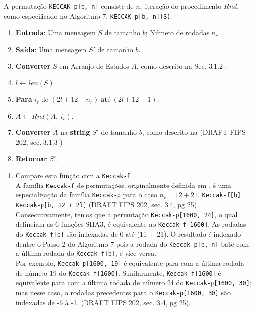 \documentclass[12pt, a4paper]{article}
\begin{document}
\begin{enumerate}
\begin{enumerate}
A permutação \verb|KECCAK-p[b, n]| consiste de $n_r$ iteração do procedimento
$Rnd$, como especificado no Algoritmo 7, \verb|KECCAK-p[b, n](S)|.\\

  \begin{enumerate}
    \item \textbf{Entrada}: Uma mensagem $S$ de tamanho $b$; Número de rodadas
    $n_r$.
    \item \textbf{Saída}: Uma mensagem $S'$ de tamanho $b$.
    \item \textbf{Converter} $S$ em Arranjo de Estados $A$, como descrito na
    Sec. 3.1.2
    \cite{nist}.
    \item $l \leftarrow len(S)$
    \item \textbf{Para} $i_r$ de $(2l + 12 - n_r)\ \textbf{até}\ (2l + 12 - 1):$
    \item[] \quad $A \leftarrow Rnd(A,\ i_r)$.
    \item \textbf{Converter} $A$ na \textbf{string} $S'$ de tamanho $b$, como
    descrito na (DRAFT FIPS 202, sec. 3.1.3 \cite{nist})
    \item \textbf{Retornar} $S'$.\\
  \end{enumerate}

\begin{enumerate}

  \item Compare esta função com a \verb|Keccak-f|.\\

      A família \verb|Keccak-f| de permutações, originalmente definida em
      \cite{bertoni}, é uma especialização da família
      \verb|Keccak-p| para o caso $n_r = 12 + 21$. \verb|Keccak-f[b]|
      \verb|Keccak-p[b, 12 + 2l]| (DRAFT FIPS 202, sec. 3.4, pg 25)\\

      Consecutivamente, temos que a permutação \verb|Keccak-p[1600, 24]|, o qual
      delineiam as 6 funções SHA3, é equivalente ao \verb|Keccak-f[1600]|. As
      rodadas do \verb|Keccak-f[b]| são indexadas de 0 até (11 + 21). O
      resultado é indexado dentre o Passo 2 do Algoritmo 7 pois a rodada do
      \verb|Keccak-p[b, n]| bate com a última rodada do \verb|Keccak-f[b]|, e
      vice versa.\\

      Por exemplo, \verb|Keccak-p[1600, 19]| é equivalente para com a última
      rodada de número 19 do \verb|Keccak-f[1600]|. Similarmente,
      \verb|Keccak-f[1600]| é equivalente para com a última rodada de número 24
      do \verb|Keccak-p[1600, 30]|; mas nesse caso, o rodadas precedentes para o
      \verb|Keccak-p[1600, 30]| são indexadas de -6 à -1. (DRAFT FIPS 202, sec.
      3.4, pg 25).


\end{enumerate}
\end{enumerate}
\end{enumerate}
\end{document}
